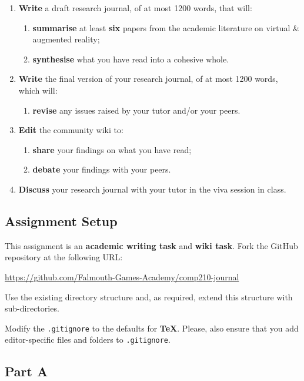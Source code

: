 \documentclass{../fal_assignment}
\begin{document}
\begin{enumerate}[label=(\Alph*)]
    \item \textbf{Write} a draft research journal, of at most 1200 words, that will:
    	\begin{enumerate}[label=(\roman*)]
    		\item \textbf{summarise} at least \textbf{six} papers from the academic literature on virtual \& augmented reality;
    		\item \textbf{synthesise} what you have read into a cohesive whole.
    	\end{enumerate}
    \item \textbf{Write} the final version of your research journal, of at most 1200 words, which will:
    	\begin{enumerate}[label=(\roman*)]
    		\item \textbf{revise} any issues raised by your tutor and/or your peers.
    	\end{enumerate}
    \item \textbf{Edit} the community wiki to:
    	\begin{enumerate}[label=(\roman*)]
    		\item \textbf{share} your findings on what you have read;
    		\item \textbf{debate} your findings with your peers.
    	\end{enumerate}
    \item \textbf{Discuss} your research journal with your tutor in the viva session in class.
\end{enumerate}

\subsection*{Assignment Setup}

This assignment is an \textbf{academic writing task} and \textbf{wiki task}. Fork the GitHub repository at the following URL:

\indent \url{https://github.com/Falmouth-Games-Academy/comp210-journal}

Use the existing directory structure and, as required, extend this structure with sub-directories.

Modify the \texttt{.gitignore} to the defaults for \textbf{TeX}. Please, also ensure that you add editor-specific files and folders to \texttt{.gitignore}. 

\subsection*{Part A}
\end{document}

